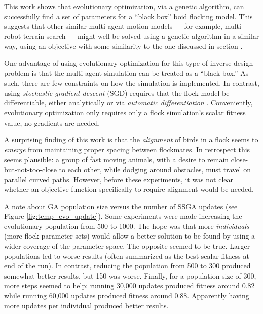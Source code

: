 \documentclass[letterpaper]{article}
\begin{document}
This work shows that evolutionary optimization, via a genetic algorithm, can successfully find a set of parameters for a ``black box'' boid flocking model. This suggests that other similar multi-agent motion models --- for example, multi-robot terrain search --- might well be solved using a genetic algorithm in a similar way, using an objective with some similarity to the one discussed in section .

One advantage of using evolutionary optimization for this type of inverse design problem is that the multi-agent simulation can be treated as a ``black box.'' As such, there are few constraints on how the simulation is implemented. In contrast, using \textit{stochastic gradient descent} (SGD) \citep{robbins_stochastic_1951} requires that the flock model be differentiable, either analytically or via \textit{automatic differentiation} \citep{baydin_automatic_2018}. Conveniently, evolutionary optimization only requires only a flock simulation's scalar fitness value, no gradients are needed.

A surprising finding of this work is that the \textit{alignment} of birds in a flock seems to \textit{emerge} from maintaining proper spacing between flockmates. In retrospect this seems plausible: a group of fast moving animals, with a desire to remain close-but-not-too-close to each other, while dodging around obstacles, must travel on parallel curved paths. However, before these experiments, it was not clear whether an objective function specifically to require alignment would be needed.

A note about GA population size versus the number of SSGA updates (see Figure \ref{fig:temp_evo_update}). Some experiments were made increasing the evolutionary population from 500 to 1000. The hope was that more \textit{individuals} (more flock parameter sets) would allow a better solution to be found by using a wider coverage of the parameter space. The opposite seemed to be true. Larger populations led to worse results (often summarized as the best scalar fitness at end of the run). In contrast, reducing the population from 500 to 300 produced somewhat better results, but 150 was worse. Finally, for a population size of 300, more steps seemed to help: running 30,000 updates produced fitness around 0.82 while running 60,000 updates produced fitness around 0.88. Apparently having more updates per individual produced better results.

\end{document}
